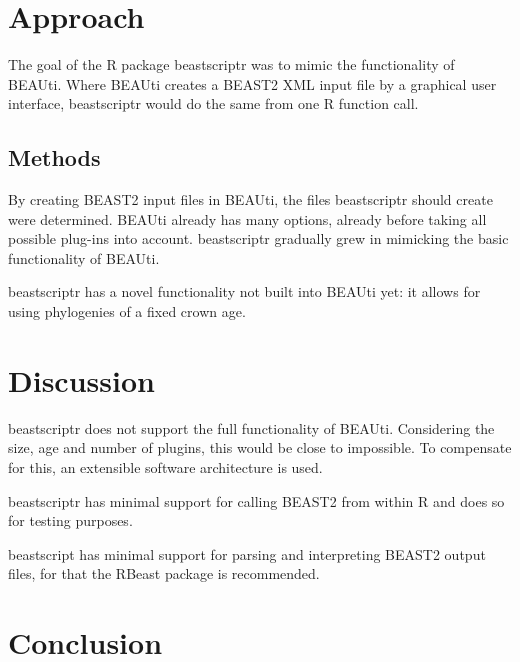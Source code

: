 \documentclass{bioinfo}
\begin{document}
\section{Approach}

The goal of the R package beastscriptr was to mimic the functionality of BEAUti.
Where BEAUti creates a BEAST2 XML input file by a graphical user interface,
beastscriptr would do the same from one R function call.

\begin{methods}
\section{Methods}

By creating BEAST2 input files in BEAUti, the files beastscriptr should
create were determined. BEAUti already has many options, already
before taking all possible plug-ins into account. beastscriptr 
gradually grew in mimicking the basic functionality of BEAUti.

beastscriptr has a novel functionality not built into BEAUti yet:
it allows for using phylogenies of a fixed crown age. 

\end{methods}

\section{Discussion}

beastscriptr does not support the full functionality of BEAUti. Considering
the size, age and number of plugins, this would be close to impossible.
To compensate for this, an extensible software architecture is used.

beastscriptr has minimal support for calling BEAST2 from within R and does
so for testing purposes. 

beastscript has minimal support for parsing and interpreting BEAST2 output files,
for that the RBeast package is recommended.

\section{Conclusion}
\end{document}
